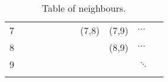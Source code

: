 \begin{table}[!htb]
\begin{tabular}{lllllllllll}
		7 &                               &                               &                               &                               &                               &                               & \cellcolor[HTML]{9B9B9B}(7,8) & \cellcolor[HTML]{C0C0C0}(7,9) & \cellcolor[HTML]{C0C0C0}$\cdots$ &  \\
		8 &                               &                               &                               &                               &                               &                               &                               & \cellcolor[HTML]{C0C0C0}(8,9) & \cellcolor[HTML]{C0C0C0}$\cdots$ &  \\
		9 &                               &                               &                               &                               &                               &                               &                               &                               & $\ddots$                         &  \\
		&                               &                               &                               &                               &                               &                               &                               &                               &                                  & 
	\end{tabular}
	\caption{Table of neighbours.}
	\label{tab:neighbours}
\end{table}